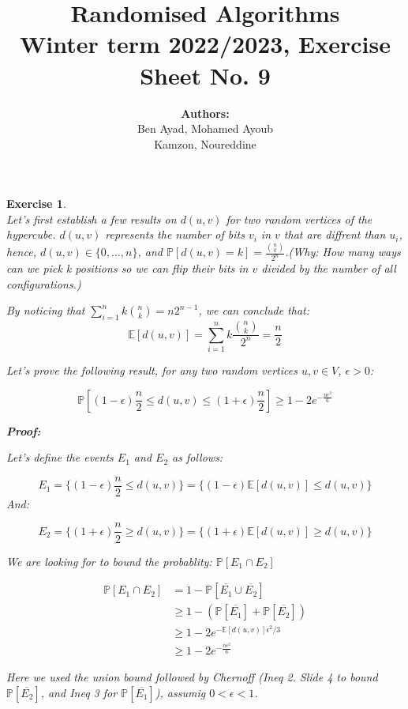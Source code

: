 \documentclass{article}
\title{Randomised Algorithms \\
Winter term 2022/2023, Exercise Sheet No. 9}
\author{
    \textbf{Authors:} \\
    Ben Ayad, Mohamed Ayoub \\
    Kamzon, Noureddine
}
\newtheorem{exo}{Exercise}
\def\P{\mathbb{P}}
\def\E{\mathbb{E}}
\begin{document}
\maketitle

\begin{exo}{\ \\}
    Let's first establish a few results on $d(u,v)$ for two random vertices of the hypercube. $d(u,v)$ represents the number of bits $v_i$ in $v$ that are diffrent than $u_i$, hence, $d(u,v) \in \{0, \dots, n\}$, and $\P[d(u,v) = k] = \frac{\binom{n}{k}}{2^n}$.(Why: How many ways can we pick k positions so we can flip their bits in $v$ divided by the number of all configurations.)

    By noticing that $\sum^{n}_{i=1} k \binom{n}{k} = n 2^{n-1}$, we can conclude that:
    \[
\E[d(u,v)] = \sum^{n}_{i=1} k \frac{\binom{n}{k}}{2^n} = \frac{n}{2}
    \]
 

    Let's prove the following result, for any two random vertices $u,v \in V    $, $\epsilon > 0$:

    \[
        \P\left[(1-\epsilon)\frac{n}{2} \leq d(u,v) \leq (1+\epsilon)\frac{n}{2}\right]
        \geq 1 - 2 e^{-\frac{n \epsilon^2 }{6}}  
    \]

\begin{tcolorbox}
   \textbf{Proof:}  

    Let's define the events $E_1$ and $E_2$ as follows:


    \[
        E_1 = \{ (1-\epsilon) \frac{n}{2} \leq d(u,v)\} 
        = \{ (1-\epsilon) \E[d(u,v)] \leq d(u,v)\}
    \]
    And:

    \[
        E_2    = \{ (1+\epsilon) \frac{n}{2} \geq d(u,v)\} 
        = \{(1+\epsilon) \E[d(u,v)] \geq d(u,v)\}    
    \]

We are looking for to bound the probablity: $\P[E_1 \cap E_2]$

\begin{align*}
    \P[E_1 \cap E_2] 
    &= 1 - \P[\overline{E_1} \cup \overline{E_2}] \\
    &\geq 1 - (\P[\overline{E_1}] +  \P[\overline{E_2}]) \\
    &\geq  1 - 2 e^{-\E[d(u,v)]\epsilon^2 / 3} \\
    &\geq  1 - 2 e^{-\frac{n \epsilon^2 }{6}} 
\end{align*}

Here we used the union bound followed by Chernoff 
(Ineq 2. Slide 4 to bound $\P[\overline{E_2}]$, and Ineq 3 for $\P[\overline{E_1}]$), assumig $0 < \epsilon < 1$.
\end{tcolorbox}



\end{exo}
\end{document}
